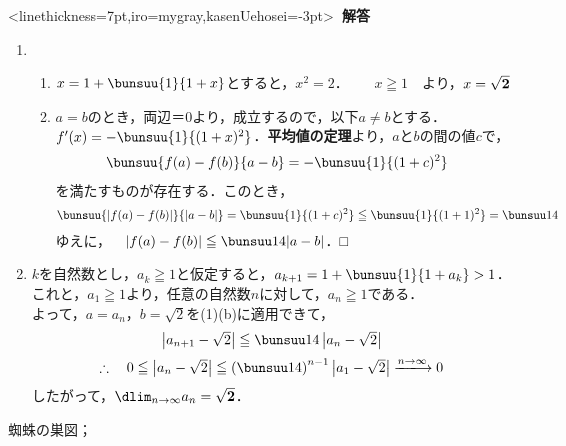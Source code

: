 \documentclass[10pt,
b5paper,
fleqn,
dvipdfmx,
uplatex
]{jsarticle}
\newcommand{\benu}{\begin{enumerate}}
\newcommand{\eenu}{\end{enumerate}}
\newcommand{\bb}{\bf\boldmath}%
\newcommand{\sq}{\textstyle\sqrt}
\newenvironment{leftbbar}{%
\def\FrameCommand{\color{mygray} \vrule width 5pt \hspace{1zw}
\color{black}}%
\MakeFramed {\advance\hsize-\width \FrameRestore}}%
{\endMakeFramed}
\newenvironment{解答}{
\hspace{-2zw}\phkasen<linethickness=7pt,iro=mygray,kasenUehosei=-3pt>{\bf \large \ 解答\ }\vspace{-1zw}\begin{leftbbar}}{\end{leftbbar}}
\newif\ifkaisetu
\begin{document}
{\ifkaisetu
\begin{解答}
\vspace{-2zw}
\benu
\item 
\benu
\item $x=1+\bunsuu{1}{1+x}$とすると，$x^2=2$．\ \ \ 
%
$x \geqq 1$\ \ より，$x={\bb \sq 2}$
\item $a=b$のとき，両辺＝0より，成立するので，以下$a \neq b$とする．\\
$f'(x)=-\bunsuu{1}{(1+x)^2}$．{\bb 平均値の定理}より，$a$と$b$の間の値$c$で，
\begin{align*}
\bunsuu{f(a)-f(b)}{a-b}&=-\bunsuu{1}{(1+c)^2}
\end{align*}
を満たすものが存在する．このとき，
\[ \bunsuu{|f(a)-f(b)|}{|a-b|}=\bunsuu{1}{(1+c)^2}\leqq \bunsuu{1}{(1+1)^2}=\bunsuu 14\]
ゆえに，\ \ $\left|f(a)-f(b)\right|\leqq \bunsuu 14|a-b|$．\hfill □
\eenu
\item $k$を自然数とし，$a_k \geqq 1$と仮定すると，$a_{k+1} =1+\bunsuu{1}{1+a_k} > 1$．\\
これと，$a_1 \geqq 1$より，任意の自然数$n$に対して，$a_n \geqq 1$である．\\
よって，$a=a_n$，$b=\sq 2$を(1)(b)に適用できて，
\[\left|a_{n+1}-\sq 2\right| \leqq \bunsuu 14\left|a_n-\sq 2\right|\]%
\[\therefore\ \ \ 0\leqq \left|a_n-\sq 2\right| \leqq \left(\bunsuu 14\right)^{n-1} \left|a_1-\sq 2\right|\xlongrightarrow[]{n\to \infty} 0\]
したがって，$\dlim_{n \to \infty} a_n={\bb \sq 2}$．
\eenu
\end{解答}

\newpage

蜘蛛の巣図；\\

}
\end{document}
